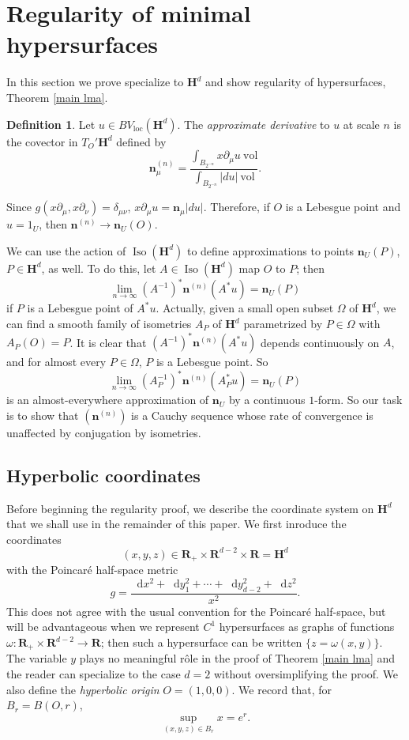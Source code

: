 \documentclass[reqno,12pt,letterpaper]{amsart}
\newcommand{\RR}{\mathbf{R}}
\newcommand{\Hyp}{\mathbf H}
\DeclareMathOperator{\Iso}{Iso}
\newcommand*\dif{\mathop{}\!\mathrm{d}}
\newcommand{\normal}{\mathbf n}
\newcommand{\vol}{\mathrm{vol}}
\newcommand{\dfn}[1]{\emph{#1}\index{#1}}
\newcommand{\loc}{\mathrm{loc}}
\theoremstyle{definition}
\newtheorem{definition}[theorem]{Definition}
\numberwithin{equation}{section}
\begin{document}
\section{Regularity of minimal hypersurfaces}\label{DeGiorgiSection}
In this section we prove specialize to $\Hyp^d$ and show regularity of hypersurfaces, Theorem \ref{main lma}.

\begin{definition}
Let $u \in BV_\loc(\Hyp^d)$. The \dfn{approximate derivative} to $u$ at scale $n$ is the covector in $T_O' \Hyp^d$ defined by
$$\normal^{(n)}_\mu = \frac{\int_{B_{2^{-n}}} x \partial_\mu u ~\vol}{\int_{B_{2^{-n}}} |du| ~\vol}.$$
\end{definition}

Since $g(x\partial_\mu, x\partial_\nu) = \delta_{\mu\nu}$, $x\partial_\mu u = \normal_\mu|du|$.
Therefore, if $O$ is a Lebesgue point and $u = 1_U$, then $\normal^{(n)} \to \normal_U(O)$.

We can use the action of $\Iso(\Hyp^d)$ to define approximations to points $\normal_U(P)$, $P \in \Hyp^d$, as well.
To do this, let $A \in \Iso(\Hyp^d)$ map $O$ to $P$; then
$$\lim_{n \to \infty} (A^{-1})^* \normal^{(n)}(A^* u) = \normal_U(P)$$
if $P$ is a Lebesgue point of $A^* u$.
Actually, given a small open subset $\Omega$ of $\Hyp^d$, we can find a smooth family of isometries $A_P$ of $\Hyp^d$ parametrized by $P \in \Omega$ with $A_P(O) = P$.
It is clear that $(A^{-1})^* \normal^{(n)}(A^* u)$ depends continuously on $A$, and for almost every $P \in \Omega$, $P$ is a Lebesgue point.
So
$$\lim_{n \to \infty} (A_P^{-1})^* \normal^{(n)}(A_P^* u) = \normal_U(P)$$
is an almost-everywhere approximation of $\normal_U$ by a continuous $1$-form.
So our task is to show that $(\normal^{(n)})$ is a Cauchy sequence whose rate of convergence is unaffected by conjugation by isometries.

\subsection{Hyperbolic coordinates}
Before beginning the regularity proof, we describe the coordinate system on $\Hyp^d$ that we shall use in the remainder of this paper. We first inroduce the coordinates
$$(x, y, z) \in \RR_+ \times \RR^{d - 2} \times \RR = \Hyp^d$$
with the Poincar\'e half-space metric
\begin{equation}\label{hyperbolic metric}
g = \frac{\dif x^2 + \dif y_1^2 + \cdots + \dif y_{d - 2}^2 + \dif z^2}{x^2}.
\end{equation}
This does not agree with the usual convention for the Poincar\'e half-space, but will be advantageous when we represent $C^1$ hypersurfaces as graphs of functions $\omega: \RR_+ \times \RR^{d - 2} \to \RR$; then such a hypersurface can be written $\{z = \omega(x, y)\}$.
The variable $y$ plays no meaningful r\^ole in the proof of Theorem \ref{main lma} and the reader can specialize to the case $d = 2$ without oversimplifying the proof.
We also define the \dfn{hyperbolic origin} $O = (1, 0, 0)$.
We record that, for $B_r = B(O, r)$,
\begin{equation}\label{sup in a ball}
\sup_{(x, y, z) \in B_r} x = e^r.
\end{equation}
\end{document}
